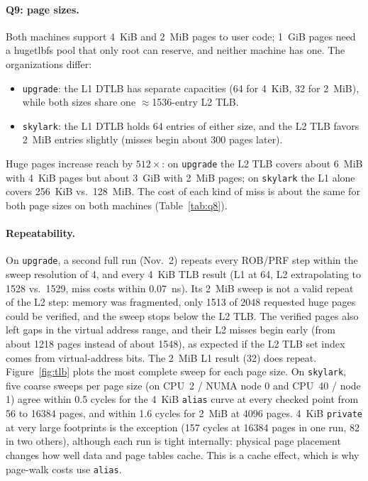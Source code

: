 \documentclass[11pt]{article}
\newcommand{\up}{\texttt{upgrade}}
\newcommand{\sk}{\texttt{skylark}}
\begin{document}
\paragraph{Q9: page sizes.} Both machines support 4~KiB and 2~MiB pages to
user code; 1~GiB pages need a hugetlbfs pool that only root can reserve, and
neither machine has one. The organizations differ:
\begin{itemize}
\item \up{}: the L1 DTLB has separate capacities (64 for 4~KiB, 32 for
  2~MiB), while both sizes share one $\approx$1536-entry L2 TLB.
\item \sk{}: the L1 DTLB holds 64 entries of either size, and the L2 TLB
  favors 2~MiB entries slightly (misses begin about 300 pages later).
\end{itemize}
Huge pages increase reach by $512\times$: on \up{} the L2 TLB covers about
6~MiB with 4~KiB pages but about 3~GiB with 2~MiB pages; on \sk{} the L1
alone covers 256~KiB vs.\ 128~MiB. The cost of each kind of miss is
about the same for both page sizes on both machines (Table~\ref{tab:q8}).

\paragraph{Repeatability.} On \up{}, a second full run (Nov.~2) repeats
every ROB/PRF step within the sweep resolution of 4, and every 4~KiB TLB
result (L1 at 64, L2 extrapolating to 1528 vs.\ 1529, miss costs within
0.07~ns). Its 2~MiB sweep is not a valid repeat of the L2 step: memory was
fragmented, only 1513 of 2048 requested huge pages could be verified, and
the sweep stops below the L2 TLB. The verified pages also left gaps in the
virtual address range, and their L2 misses begin early (from about 1218
pages instead of about 1548), as expected if the L2 TLB set index comes
from virtual-address bits. The 2~MiB L1 result (32) does repeat. Figure~\ref{fig:tlb}
plots the most complete sweep for each page size.
On \sk{}, five coarse sweeps per page size (on
CPU~2 / NUMA node 0 and CPU~40 / node 1) agree within 0.5 cycles for the
4~KiB \texttt{alias} curve at every checked point from 56 to 16384 pages,
and within 1.6 cycles for 2~MiB at 4096 pages. 4~KiB \texttt{private} at
very large footprints is the exception (157 cycles at 16384 pages in one
run, 82 in two others), although each run is tight internally: physical
page placement changes how well data and page tables cache. This is a
cache effect, which is why page-walk costs use \texttt{alias}.
\end{document}
